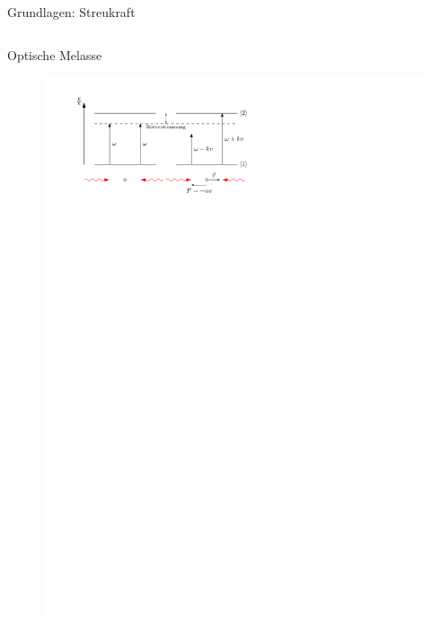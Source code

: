 \documentclass[12pt,xcolor=dvipsnames]{beamer}
\begin{document}
\begin{frame}{Grundlagen: Streukraft}
\begin{columns}[t]
	\end{columns}

\end{frame}

\begin{frame}{Optische Melasse}
\begin{figure}[h]
	\centering
	\includegraphics[width=\textwidth]{./figures/melasse.pdf}
\end{figure}
\end{frame}
\end{document}
